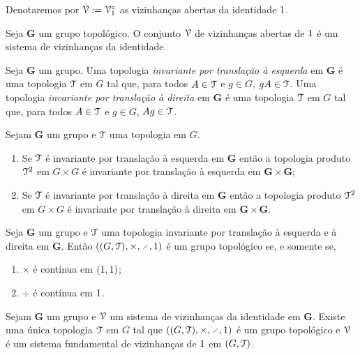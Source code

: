 Denotaremos por $\mathcal{V} := \mathcal{V}_1^\circ$ as vizinhanças abertas da identidade $1$.

\begin{proposition}
Seja $\bm G$ um grupo topológico. O conjunto $\mathcal{V}$ de vizinhanças abertas de $1$ é um sistema de vizinhanças da identidade.
\end{proposition}

\begin{definition}
Seja $\bm G$ um grupo. Uma topologia \emph{invariante por translação à esquerda} em $\bm G$ é uma topologia $\mathcal{T}$ em $G$ tal que, para todos $A \in \mathcal{T}$ e $g \in G$, $gA \in \mathcal{T}$. Uma topologia \emph{invariante por translação à direita} em $\bm G$ é uma topologia $\mathcal{T}$ em $G$ tal que, para todos $A \in \mathcal{T}$ e $g \in G$, $Ag \in \mathcal{T}$.
\end{definition}

\begin{proposition}
Sejam $\bm G$ um grupo e $\mathcal{T}$ uma topologia em $G$.
	\begin{enumerate}
	\item Se $\mathcal{T}$ é invariante por translação à esquerda em $\bm G$ então a topologia produto $\mathcal{T}^2$ em $G \times G$ é invariante por translação à esquerda em $\bm G \times \bm G$;
	\item Se $\mathcal{T}$ é invariante por translação à direita em $\bm G$ então a topologia produto $\mathcal{T}^2$ em $G \times G$ é invariante por translação à direita em $\bm G \times \bm G$.
	\end{enumerate}
\end{proposition}

\begin{proposition}
Seja $\bm G$ um grupo e $\mathcal{T}$ uma topologia invariante por translação à esquerda e à direita em $\bm G$. Então $((G,\topo),\times,\div,\id)$ é um grupo topológico se, e somente se,
	\begin{enumerate}
	\item $\times$ é contínua em $(1,1)$;
	\item $\div$ é contínua em $1$.
	\end{enumerate}
\end{proposition}

\begin{proposition}
Sejam $\bm G$ um grupo e $\mathcal{V}$ um sistema de vizinhanças da identidade em $\bm G$. Existe uma única topologia $\mathcal{T}$ em $G$ tal que $((G,\topo),\times,\div,\id)$ é um grupo topológico e $\mathcal{V}$ é um sistema fundamental de vizinhanças de $1$ em $(G,\mathcal{T})$.
\end{proposition}

